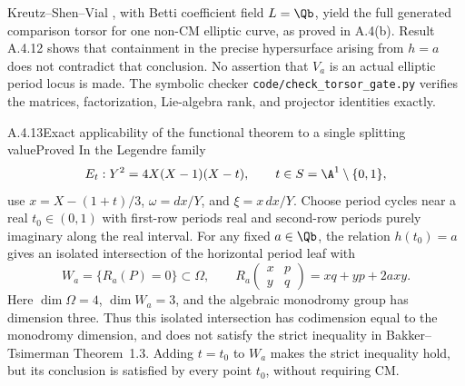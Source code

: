 Kreutz--Shen--Vial \cite[Proposition 3.1; Theorem 5.13(ii)]{GenKSV2026}, with Betti coefficient field $L=\Qb$, yield the full generated comparison torsor for one non-CM elliptic curve, as proved in A.4(b). Result A.4.12 shows that containment in the precise hypersurface arising from $h=a$ does not contradict that conclusion. No assertion that $V_a$ is an actual elliptic period locus is made. The symbolic checker \texttt{code/check\_torsor\_gate.py} verifies the matrices, factorization, Lie-algebra rank, and projector identities exactly.

\begin{result}{A.4.13}{Exact applicability of the functional theorem to a single splitting value}{Proved}
In the Legendre family
\[
 E_t:Y^2=4X(X-1)(X-t),\qquad t\in S=\A^1\setminus\{0,1\},
\]
use $x=X-(1+t)/3$, $\omega=dx/Y$, and $\xi=x\,dx/Y$. Choose period cycles near a real $t_0\in(0,1)$ with first-row periods real and second-row periods purely imaginary along the real interval. For any fixed $a\in\Qb$, the relation $h(t_0)=a$ gives an isolated intersection of the horizontal period leaf with
\[
 W_a=\{R_a(P)=0\}\subset\Omega,\qquad
 R_a\begin{pmatrix}x&p\\y&q\end{pmatrix}=xq+yp+2axy.
\]
Here $\dim\Omega=4$, $\dim W_a=3$, and the algebraic monodromy group has dimension three. Thus this isolated intersection has codimension equal to the monodromy dimension, and does not satisfy the strict inequality in Bakker--Tsimerman Theorem~1.3. Adding $t=t_0$ to $W_a$ makes the strict inequality hold, but its conclusion is satisfied by every point $t_0$, without requiring CM.
\end{result}
